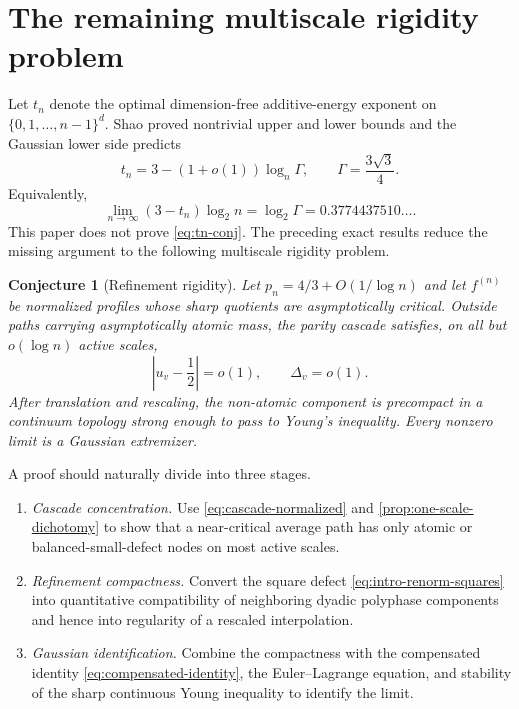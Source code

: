 \documentclass[11pt,reqno]{amsart}
\numberwithin{equation}{section}
\newtheorem{conjecture}[conjecture]{Conjecture}
\theoremstyle{definition}
\theoremstyle{remark}
\begin{document}
\section{The remaining multiscale rigidity problem}

Let $t_n$ denote the optimal dimension-free additive-energy exponent on
$\{0,1,\ldots,n-1\}^d$.  Shao proved nontrivial upper and lower bounds and
the Gaussian lower side predicts
\begin{equation}\label{eq:tn-conj}
  t_n
  =3-(1+o(1))\log_n\Gamma,
  \qquad
  \Gamma=\frac{3\sqrt3}{4}.
\end{equation}
Equivalently,
\begin{equation}\label{eq:tn-conj2}
  \lim_{n\to\infty}(3-t_n)\log_2 n
  =\log_2\Gamma
  =0.3774437510\ldots.
\end{equation}
This paper does not prove \eqref{eq:tn-conj}.  The preceding exact results
reduce the missing argument to the following multiscale rigidity problem.

\begin{conjecture}[Refinement rigidity]\label{conj:rigidity}
Let $p_n=4/3+O(1/\log n)$ and let $f^{(n)}$ be normalized profiles whose
sharp quotients are asymptotically critical.  Outside paths carrying
asymptotically atomic mass, the parity cascade satisfies, on all but
$o(\log n)$ active scales,
\[
  \left|u_v-\frac12\right|=o(1),
  \qquad
  \Delta_v=o(1).
\]
After translation and rescaling, the non-atomic component is precompact in
a continuum topology strong enough to pass to Young's inequality.
Every nonzero limit is a Gaussian extremizer.
\end{conjecture}

A proof should naturally divide into three stages.

\begin{enumerate}[label=\textup{\arabic*.},leftmargin=2.2em]
  \item \emph{Cascade concentration.}  Use
  \eqref{eq:cascade-normalized} and \cref{prop:one-scale-dichotomy} to show
  that a near-critical average path has only atomic or balanced-small-defect
  nodes on most active scales.
  \item \emph{Refinement compactness.}  Convert the square defect
  \eqref{eq:intro-renorm-squares} into quantitative compatibility of
  neighboring dyadic polyphase components and hence into regularity of a
  rescaled interpolation.
  \item \emph{Gaussian identification.}  Combine the compactness with the
  compensated identity \eqref{eq:compensated-identity}, the
  Euler--Lagrange equation, and stability of the sharp continuous Young
  inequality to identify the limit.
\end{enumerate}
\end{document}
